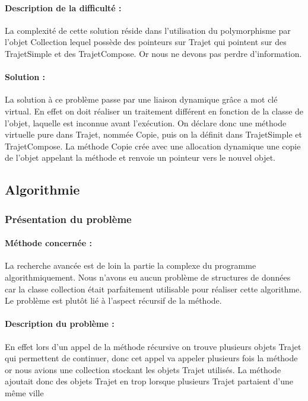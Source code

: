 \documentclass[10pt,a4paper,twoside]{article}
\begin{document}
\paragraph{Description de la difficulté :} La complexité de cette solution réside dans l'utilisation du polymorphisme par l'objet Collection lequel possède des pointeurs sur Trajet qui pointent sur des TrajetSimple et des TrajetCompose. Or nous ne devons pas perdre d'information.

\paragraph{Solution :} La solution à ce problème passe par une liaison dynamique grâce a mot clé virtual. En effet on doit réaliser un traitement différent en fonction de la classe de l'objet, laquelle est inconnue avant l'exécution. On déclare donc une méthode virtuelle pure dans Trajet, nommée Copie, puis on la définit dans TrajetSimple et TrajetCompose. La méthode Copie crée avec une allocation dynamique une copie de l'objet appelant la méthode et renvoie un pointeur vers le nouvel objet.

\subsection{Algorithmie}

\subsubsection{Présentation du problème}
\paragraph{Méthode concernée :} La recherche avancée est de loin la partie la complexe du programme algorithmiquement. Nous n'avons eu aucun problème de structures de données car la classe collection était parfaitement utilisable pour réaliser cette algorithme. Le problème est plutôt lié à l'aspect récursif de la méthode.
\paragraph{Description du problème :} En effet lors d'un appel de la méthode récursive on trouve plusieurs objets Trajet qui permettent de continuer, donc cet appel va appeler plusieurs fois la méthode or nous avions une collection stockant les objets Trajet utilisés. La méthode ajoutait donc des objets Trajet en trop lorsque plusieurs Trajet partaient d'une même ville
\end{document}
